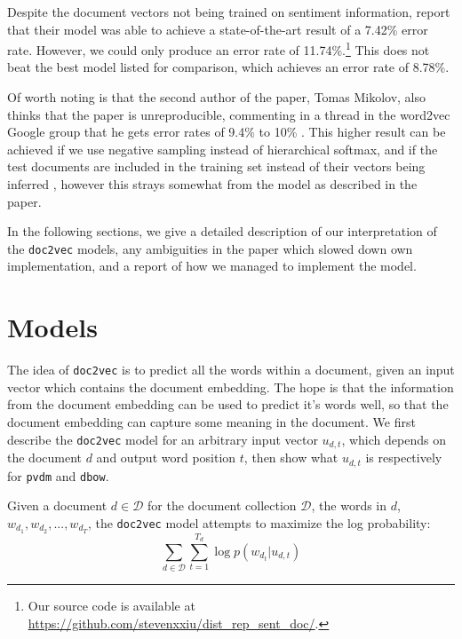 \documentclass{article}
\begin{document}
Despite the document vectors not being trained on sentiment information, \cite{le_distributed_2014} report that their model was able to achieve a state-of-the-art result of a 7.42\% error rate. However, we could only produce an error rate of 11.74\%.\footnote{Our source code is available at \url{https://github.com/stevenxxiu/dist_rep_sent_doc/}.} This does not beat the best model listed for comparison, which achieves an error rate of 8.78\%.

Of worth noting is that the second author of the paper, Tomas Mikolov, also thinks that the paper is unreproducible, commenting in a thread in the word2vec Google group that he gets error rates of 9.4\% to 10\% \cite{mikolov_distributed_2014} . This higher result can be achieved if we use negative sampling instead of hierarchical softmax, and if the test documents are included in the training set instead of their vectors being inferred \citep{mohr_gensim_2017}, however this strays somewhat from the model as described in the paper.

In the following sections, we give a detailed description of our interpretation of the \texttt{doc2vec} models, any ambiguities in the paper which slowed down own implementation, and a report of how we managed to implement the model.

\section{Models}
The idea of \texttt{doc2vec} is to predict all the words within a document, given an input vector which contains the document embedding. The hope is that the information from the document embedding can be used to predict it's words well, so that the document embedding can capture some meaning in the document. We first describe the \texttt{doc2vec} model for an arbitrary input vector $u_{d,t}$, which depends on the document $d$ and output word position $t$, then show what $u_{d,t}$ is respectively for \texttt{pvdm} and \texttt{dbow}.

Given a document $d\in\mathcal{D}$ for the document collection $\mathcal{D}$, the words in $d$, $w_{d_1},w_{d_2},...,w_{d_T}$, the \texttt{doc2vec} model attempts to maximize the log probability:
    \[\sum_{d\in\mathcal{D}}\sum_{t=1}^{T_d} \log p(w_{d_t}|u_{d,t})\]
\end{document}

